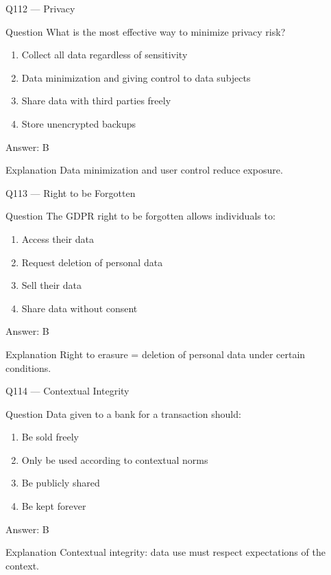 \documentclass[aspectratio=169,8pt]{beamer}
\begin{document}
	\begin{frame}{Q112 --- Privacy}
		\begin{block}{Question}
			What is the most effective way to minimize privacy risk?
		\end{block}
		\begin{enumerate}
			\item Collect all data regardless of sensitivity
			\item Data minimization and giving control to data subjects
			\item Share data with third parties freely
			\item Store unencrypted backups
		\end{enumerate}
		\begin{exampleblock}{Answer: B}\end{exampleblock}
		\begin{block}{Explanation}
			Data minimization and user control reduce exposure.
		\end{block}
	\end{frame}
	
	\begin{frame}{Q113 --- Right to be Forgotten}
		\begin{block}{Question}
			The GDPR right to be forgotten allows individuals to:
		\end{block}
		\begin{enumerate}
			\item Access their data
			\item Request deletion of personal data
			\item Sell their data
			\item Share data without consent
		\end{enumerate}
		\begin{exampleblock}{Answer: B}\end{exampleblock}
		\begin{block}{Explanation}
			Right to erasure = deletion of personal data under certain conditions.
		\end{block}
	\end{frame}
	
	\begin{frame}{Q114 --- Contextual Integrity}
		\begin{block}{Question}
			Data given to a bank for a transaction should:
		\end{block}
		\begin{enumerate}
			\item Be sold freely
			\item Only be used according to contextual norms
			\item Be publicly shared
			\item Be kept forever
		\end{enumerate}
		\begin{exampleblock}{Answer: B}\end{exampleblock}
		\begin{block}{Explanation}
			Contextual integrity: data use must respect expectations of the context.
		\end{block}
	\end{frame}
	
\end{document}
